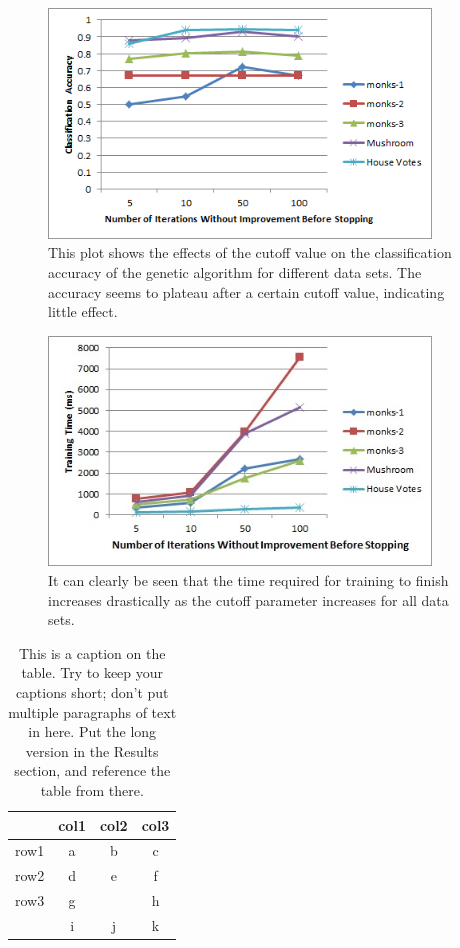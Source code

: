\documentclass[12pt, letterpaper]{article}
\begin{document}
\begin{figure}[!htb]
\begin{center}
\includegraphics[width=4in]{images/cutoff_accuracy.png}
\end{center}
\caption{This plot shows the effects of the cutoff value on the classification
accuracy of the genetic algorithm for different data sets.  The accuracy seems
to plateau after a certain cutoff value, indicating little effect.
}
\label{Testing Times of Multiple Decision Trees}
\end{figure}

\begin{figure}[!htb]
\begin{center}
\includegraphics[width=4in]{images/cutoff_time.jpg}
\end{center}
\caption{It can clearly be seen that the time required for training to finish
increases drastically as the cutoff parameter increases for all data sets. 
}
\label{Testing Times of Multiple Decision Trees}
\end{figure}

\begin{table}
\begin{center}
\begin{tabular}{|c||c|cc}
\hline
& col1 & col2 & col3\\
\hline \hline
row1 & a & b & c\\
\hline 
row2 & d & e & f\\
\hline 
row3 & g &   & h\\
 & i & j & k\\
\hline 
\end{tabular}
\end{center}
\caption{This is a caption on the table.  Try to keep your captions short; don't
put multiple paragraphs of text in here.  Put the long version in the Results
section, and reference the table from there.}
\label{sometable}
\end{table}
\end{document}
